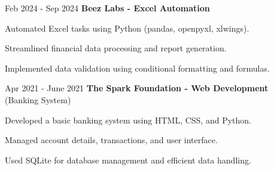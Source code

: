 \vspace{0.2 cm}
\begin{twocolentry}{Feb 2024 - Sep 2024}
\textbf{Beez Labs - Excel Automation}\end{twocolentry}
\vspace{0.10 cm}
\begin{onecolentry}
\begin{highlights}
\item Automated Excel tasks using Python (pandas, openpyxl, xlwings).
\item Streamlined financial data processing and report generation.
\item Implemented data validation using conditional formatting and formulas.
\end{highlights}
\end{onecolentry}
\vspace{0.2 cm}
\begin{twocolentry}{Apr 2021 - June 2021}
\textbf{The Spark Foundation - Web Development} \\ (Banking System)\end{twocolentry}
\vspace{0.10 cm}
\begin{onecolentry}
\begin{highlights}
\item Developed a basic banking system using HTML, CSS, and Python.
\item Managed account details, transactions, and user interface.
\item Used SQLite for database management and efficient data handling.
\end{highlights}
\end{onecolentry}


